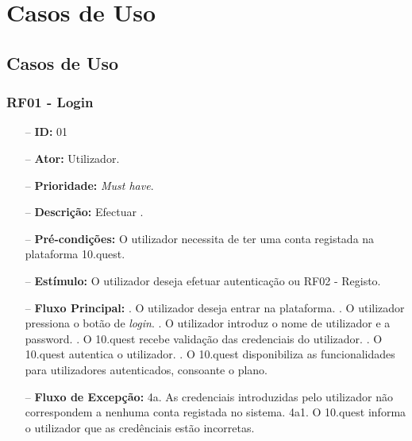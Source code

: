 \chapter{Casos de Uso}
\label{a:cu}

\section{Casos de Uso}

\subsection{RF01 - Login}
\begin{itemize}
	\item[--] \textbf{ID:} 01
	\item[--]  \textbf{Ator:} Utilizador.
	\item[--]  \textbf{Prioridade:} \textit{Must have}.
	\item[--]  \textbf{Descrição:} Efectuar .
	\item[--]  \textbf{Pré-condições:} O utilizador necessita de ter uma conta registada na plataforma 10.quest.
	\item[--]  \textbf{Estímulo:} O utilizador deseja efetuar autenticação ou RF02 - Registo.
	\item[--]  \textbf{Fluxo Principal:} 
			. O utilizador deseja entrar na plataforma.
			. O utilizador pressiona o botão de \textit{login}.
			. O utilizador introduz o nome de utilizador e a password.
			. O 10.quest recebe validação das credenciais do utilizador.
			. O 10.quest autentica o utilizador.
			. O 10.quest disponibiliza as funcionalidades para utilizadores autenticados, consoante o plano.
	\item[--]  \textbf{Fluxo de Excepção:} 
			\subitem 4a. As credenciais introduzidas pelo utilizador não correspondem a nenhuma conta registada no sistema.
			\subitem 4a1. O 10.quest informa o utilizador que as credênciais estão incorretas.
\end{itemize}
\newpage

